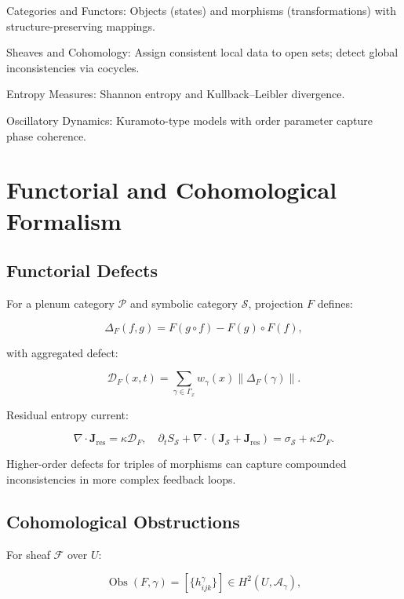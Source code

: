 \documentclass[12pt]{article}
\theoremstyle{plain}
\begin{document}
Categories and Functors: Objects (states) and morphisms (transformations) with structure-preserving mappings.

Sheaves and Cohomology: Assign consistent local data to open sets; detect global inconsistencies via cocycles.

Entropy Measures: Shannon entropy and Kullback–Leibler divergence.

Oscillatory Dynamics: Kuramoto-type models with order parameter capture phase coherence.

\section{Functorial and Cohomological Formalism}

\subsection{Functorial Defects}

For a plenum category \(\mathcal{P}\) and symbolic category \(\mathcal{S}\), projection \(F\) defines:

\begin{equation}
\Delta_F(f,g) = F(g \circ f) - F(g) \circ F(f),
\end{equation}

with aggregated defect:

\begin{equation}
\mathcal{D}_F(x,t) = \sum_{\gamma \in \Gamma_x} w_\gamma(x) \|\Delta_F(\gamma)\|.
\end{equation}

Residual entropy current:

\begin{equation}
\nabla \cdot \mathbf{J}_{\mathrm{res}} = \kappa \mathcal{D}_F, \quad \partial_t S_\mathcal{S} + \nabla \cdot (\mathbf{J}_\mathcal{S} + \mathbf{J}_{\mathrm{res}}) = \sigma_\mathcal{S} + \kappa \mathcal{D}_F.
\end{equation}

Higher-order defects for triples of morphisms can capture compounded inconsistencies in more complex feedback loops.

\subsection{Cohomological Obstructions}

For sheaf \(\mathcal{F}\) over \(U\):

\begin{equation}
\operatorname{Obs}(F,\gamma) = [\{h_{ijk}^\gamma\}] \in H^2(U, \mathcal{A}_\gamma),
\end{equation}
\end{document}
